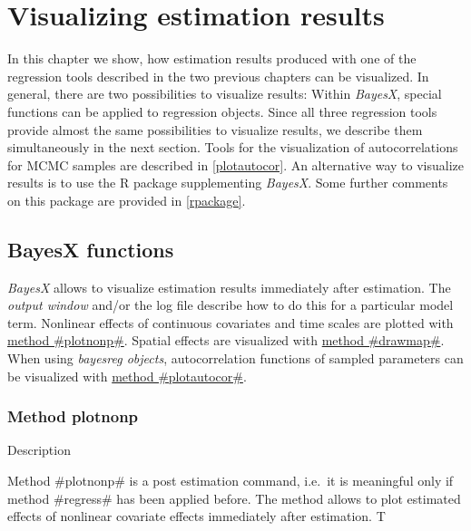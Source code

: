 \chapter{Visualizing estimation results}
\label{visualization} 

In this chapter we show, how estimation results produced with one of the regression tools described in the two previous
chapters can be visualized. In general, there are two possibilities to visualize results: Within {\em BayesX}, special
functions can be applied to regression objects. Since all three regression tools provide almost the same possibilities to
visualize results, we describe them simultaneously in the next section. Tools for the visualization of autocorrelations for
MCMC samples are described in \autoref{plotautocor}. An alternative way to visualize results is to use the R package
supplementing {\it BayesX}. Some further comments on this package are provided in \autoref{rpackage}.

\section{BayesX functions} \label{bayesxplot}

{\em BayesX} allows to visualize estimation results immediately
after estimation. The {\em output window} and/or the log file
describe how to do this for a particular model term. Nonlinear
effects of continuous covariates and time scales are plotted with
\hyperref[bayesxplotnonp]{method #plotnonp#}. Spatial effects are
visualized with \hyperref[drawmap]{method #drawmap#}. When using
{\em bayesreg objects}, autocorrelation functions of sampled
parameters can be visualized with \hyperref[plotautocor]{method
#plotautocor#}.

\newpage

\subsection{Method plotnonp} \label{bayesxplotnonp}  

\begin{stanza}{Description}

Method #plotnonp# is a post estimation command, i.e.~it is
meaningful only if method #regress# has been applied before. The
method allows to plot estimated effects of nonlinear covariate
effects immediately after estimation. T

\end{stanza}

